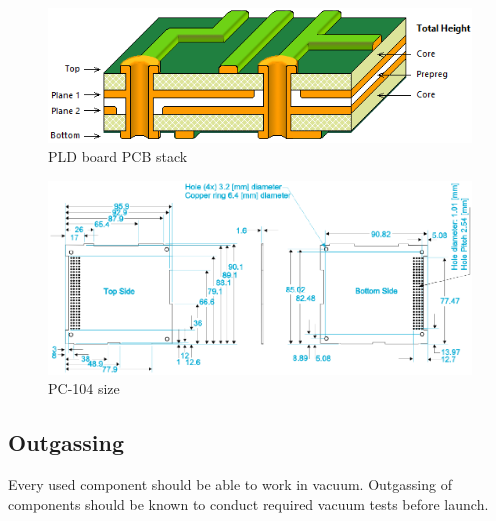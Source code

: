     \begin{figure}[H]
        \centering
        \includegraphics[width=0.5\paperwidth]{img/PLD_PCB_stack.png}
        \caption{PLD board PCB stack}
        \label{PLD_PCB_stack}
    \end{figure}    

    \begin{figure}[H]
        \centering
        \includegraphics[width=0.7\paperwidth]{img/PC104_PLD_size.png}
        \caption{PC-104 size}
        \label{PLD_PCB_size}
    \end{figure}    



\subsection{Outgassing}
    Every used component should be able to work in vacuum. Outgassing of components should be known to conduct required vacuum tests before launch.

